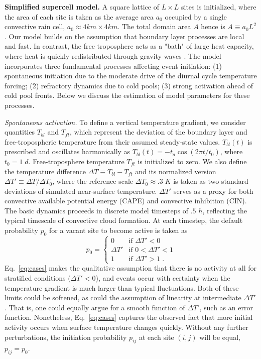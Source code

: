\documentclass{article}
\begin{document}
\begin{methods}
\noindent
{\bf Simplified supercell model.}
A square lattice of $L\times L$ sites is initialized, where the area of each site is taken as the average area $a_0$ occupied by a single convective rain cell, $a_0\approx 4km\times 4km$. 
The total domain area $A$ hence is $A\equiv a_0L^2$.
Our model builds on the assumption that boundary layer processes are local and fast. In contrast, the free troposphere acts as a "bath" of large heat capacity, where heat is quickly redistributed through gravity waves \cite{bretherton1989gravity}. 
The model incorporates three fundamental processes affecting event initiation: 
(1) spontaneous initiation due to the moderate drive of the diurnal cycle temperature forcing;
(2) refractory dynamics due to cold pools; 
(3) strong activation ahead of cold pool fronts.
Below we discuss the estimation of model parameters for these processes.

\noindent
{\it Spontaneous activation.}
To define a vertical temperature gradient, we consider quantities $T_{bl}$ and $T_{ft}$, which represent the deviation of the boundary layer and free-tropospheric temperature from their assumed steady-state values.
$T_{bl}(t)$ is prescribed and oscillates harmonically as $T_{bl}(t)=-t_a \cos (2\pi t/t_0)$, where $t_0=1\;d$.
Free-troposphere temperature $T_{ft}$ is initialized to zero.
We also define the temperature difference $\Delta T\equiv T_{bl}-T_{ft}$ and its normalized version $\Delta T'\equiv \Delta T/\Delta T_0$, where the reference scale $\Delta T_0\approx .3\;K$ is taken as two standard deviations of simulated near-surface temperature.
$\Delta T'$ serves as a proxy for both convective available potential energy (CAPE) and convective inhibition (CIN).
The basic dynamics proceeds in discrete model timesteps of $.5$ $h$, reflecting the typical timescale of convective cloud formation. 
At each timestep, the default probability $p_0$ for a vacant site to become active is taken as
\begin{equation}
    p_0=\begin{cases}
    0 & \text{if $\Delta T'<0$}\\
    \Delta T' & \text{if $0<\Delta T'<1$}\\
    1 & \text{if $\Delta T'>1$}\;.
    \end{cases}
    \label{eq:cases}
\end{equation}
Eq.~\ref{eq:cases} makes the qualitative assumption that there is no activity at all for stratified conditions ($\Delta T'<0$), and events occur with certainty when the temperature gradient is much larger than typical fluctuations. 
Both of these limits could be softened, as could the assumption of linearity at intermediate $\Delta T'$. That is, one could equally argue for a smooth function of $\Delta T'$, such as an error function. 
Nonetheless, Eq.~\ref{eq:cases} captures the observed fact that more initial activity occurs when surface temperature changes quickly.
Without any further perturbations, the initiation probability $p_{ij}$ at each site $(i,j)$ will be equal, $p_{ij}=p_0$.


\end{methods}
\end{document}
